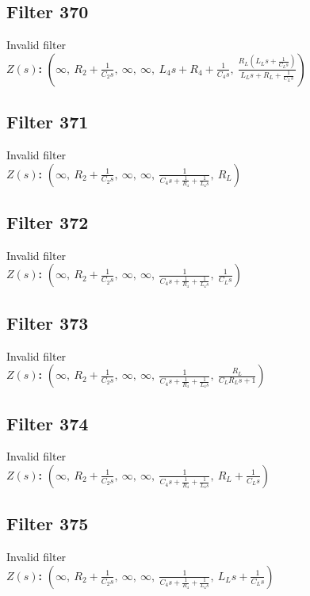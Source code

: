 \documentclass{article}
\begin{document}
\subsection*{Filter 370}
Invalid filter \\ 
\textbf{$Z(s)$:} $\left( \infty, \  R_{2} + \frac{1}{C_{2} s}, \  \infty, \  \infty, \  L_{4} s + R_{4} + \frac{1}{C_{4} s}, \  \frac{R_{L} \left(L_{L} s + \frac{1}{C_{L} s}\right)}{L_{L} s + R_{L} + \frac{1}{C_{L} s}}\right)$ \\ 
\subsection*{Filter 371}
Invalid filter \\ 
\textbf{$Z(s)$:} $\left( \infty, \  R_{2} + \frac{1}{C_{2} s}, \  \infty, \  \infty, \  \frac{1}{C_{4} s + \frac{1}{R_{4}} + \frac{1}{L_{4} s}}, \  R_{L}\right)$ \\ 
\subsection*{Filter 372}
Invalid filter \\ 
\textbf{$Z(s)$:} $\left( \infty, \  R_{2} + \frac{1}{C_{2} s}, \  \infty, \  \infty, \  \frac{1}{C_{4} s + \frac{1}{R_{4}} + \frac{1}{L_{4} s}}, \  \frac{1}{C_{L} s}\right)$ \\ 
\subsection*{Filter 373}
Invalid filter \\ 
\textbf{$Z(s)$:} $\left( \infty, \  R_{2} + \frac{1}{C_{2} s}, \  \infty, \  \infty, \  \frac{1}{C_{4} s + \frac{1}{R_{4}} + \frac{1}{L_{4} s}}, \  \frac{R_{L}}{C_{L} R_{L} s + 1}\right)$ \\ 
\subsection*{Filter 374}
Invalid filter \\ 
\textbf{$Z(s)$:} $\left( \infty, \  R_{2} + \frac{1}{C_{2} s}, \  \infty, \  \infty, \  \frac{1}{C_{4} s + \frac{1}{R_{4}} + \frac{1}{L_{4} s}}, \  R_{L} + \frac{1}{C_{L} s}\right)$ \\ 
\subsection*{Filter 375}
Invalid filter \\ 
\textbf{$Z(s)$:} $\left( \infty, \  R_{2} + \frac{1}{C_{2} s}, \  \infty, \  \infty, \  \frac{1}{C_{4} s + \frac{1}{R_{4}} + \frac{1}{L_{4} s}}, \  L_{L} s + \frac{1}{C_{L} s}\right)$ \\ 
\end{document}
